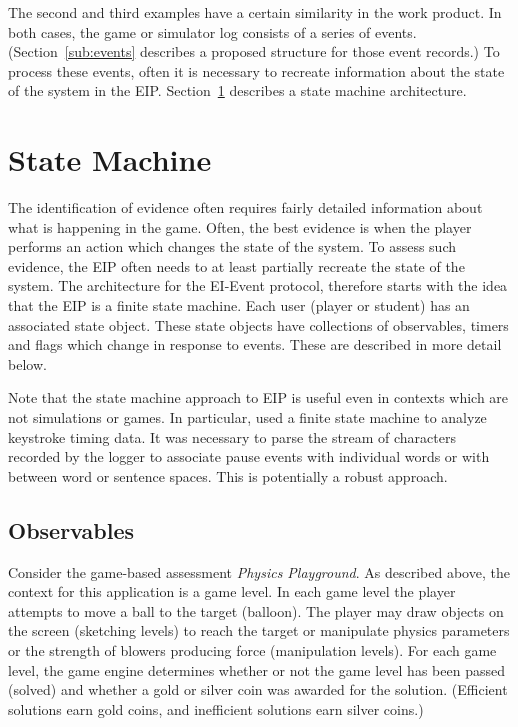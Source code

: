 \documentclass{article}
\begin{document}
  The second and third examples have a certain similarity in the work
  product.  In both cases, the game or simulator log consists of a
  series of events.  (Section~\ref{sub:events} describes a proposed
  structure for those event records.)  To process these events, often
  it is necessary to recreate information about the state of the
  system in the EIP.  Section~\ref{sec:stateMachine} describes a state
  machine architecture.

  \section{State Machine}
  \label{sec:stateMachine}

  The identification of evidence often requires fairly detailed
  information about what is happening in the game.  Often, the best
  evidence is when the player performs an action which changes the
  state of the system.  To assess such evidence, the EIP often needs
  to at least partially recreate the state of the system. The
  architecture for the EI-Event protocol, therefore starts
  with the idea that the EIP is a finite state machine.  Each user
  (player or student) has an associated state object.  These state
  objects have collections of observables, timers and flags which
  change in response to events.  These are described in more detail
  below.

  Note that the state machine approach to EIP is useful even in
  contexts which are not simulations or games.  In particular,
   used a finite state machine to analyze keystroke
  timing data.  It was necessary to parse the stream of characters
  recorded by the logger to associate pause events with individual
  words or with between word or sentence spaces.  This is potentially
  a robust approach.

  \subsection{Observables}
  \label{sub:obs}

  Consider the game-based assessment \textit{Physics Playground}.  As
  described above, the context for this application is a game level.
  In each game level the player attempts to move a ball to the target
  (balloon).  The player may draw objects on the screen (sketching
  levels) to reach the target or manipulate physics parameters or the
  strength of blowers producing force (manipulation levels).  For each
  game level, the game engine determines whether or not the game level
  has been passed (solved) and whether a gold or silver coin was
  awarded for the solution.  (Efficient solutions earn gold coins, and
  inefficient solutions earn silver coins.)
\end{document}
